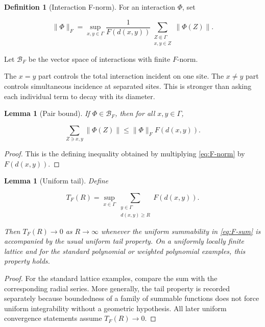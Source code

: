 \documentclass[12pt]{article}
\newtheorem{lemma}[theorem]{Lemma}
\theoremstyle{definition}
\newtheorem{definition}[theorem]{Definition}
\theoremstyle{remark}
\begin{document}
\begin{definition}[Interaction F-norm]
For an interaction $\Phi$, set

\begin{equation}
  \|\Phi\|_F
  =\sup_{x,y\in\Gamma}
  \frac{1}{F(d(x,y))}
  \sum_{\substack{Z\Subset\Gamma\\x,y\in Z}}
  \|\Phi(Z)\|.
  \label{eq:F-norm}
\end{equation}

Let $\mathcal B_F$ be the vector space of interactions with finite
$F$-norm.
\end{definition}

The $x=y$ part controls the total interaction incident on one site.  The
$x\ne y$ part controls simultaneous incidence at separated sites.  This is
stronger than asking each individual term to decay with its diameter.

\begin{lemma}[Pair bound]
If $\Phi\in\mathcal B_F$, then for all $x,y\in\Gamma$,

\begin{equation}
  \sum_{Z\ni x,y}\|\Phi(Z)\|
  \le \|\Phi\|_F F(d(x,y)).
\end{equation}
\end{lemma}

\begin{proof}
This is the defining inequality obtained by multiplying
\cref{eq:F-norm} by $F(d(x,y))$.
\end{proof}

\begin{lemma}[Uniform tail]
Define

\begin{equation}
  T_F(R)
  =\sup_{x\in\Gamma}
  \sum_{\substack{y\in\Gamma\\d(x,y)\ge R}}F(d(x,y)).
\end{equation}

Then $T_F(R)\to0$ as $R\to\infty$ whenever the uniform summability in
\cref{eq:F-sum} is accompanied by the usual uniform tail property.  On a
uniformly locally finite lattice and for the standard polynomial or weighted
polynomial examples, this property holds.
\end{lemma}

\begin{proof}
For the standard lattice examples, compare the sum with the corresponding
radial series.  More generally, the tail property is recorded separately
because boundedness of a family of summable functions does not force uniform
integrability without a geometric hypothesis.  All later uniform convergence
statements assume $T_F(R)\to0$.
\end{proof}
\end{document}

